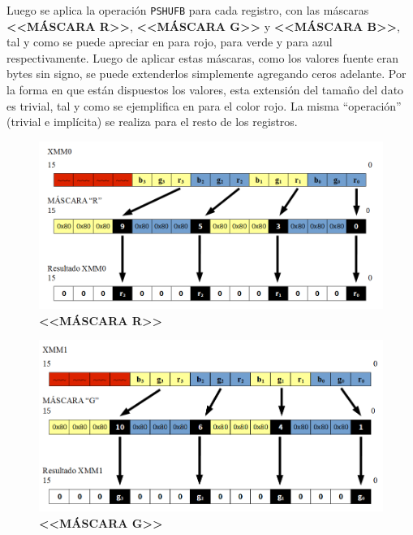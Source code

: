 Luego se aplica la operación \texttt{PSHUFB} para cada registro, con las
máscaras \textbf{<<MÁSCARA R>>}, \textbf{<<MÁSCARA G>>} y \textbf{<<MÁSCARA
B>>}, tal y como se puede apreciar en  para rojo,
 para verde y  para azul respectivamente.
Luego de aplicar estas máscaras, como los valores fuente eran bytes sin signo,
se puede extenderlos simplemente agregando ceros adelante. Por la forma en que
están dispuestos los valores, esta extensión del tamaño del dato es trivial, tal
y como se ejemplifica en  para el color rojo. La misma
``operación'' (trivial e implícita) se realiza para el resto de los registros.

\begin{figure}[H]
  \begin{center}
  \includegraphics[scale=0.55]{imagenes/popart-mask-r.png}
  \caption{\textbf{<<MÁSCARA R>>}}
  \label{fig:popart_mask_r}
  \end{center}
\end{figure}

\begin{figure}[H]
  \begin{center}
  \includegraphics[scale=0.55]{imagenes/popart-mask-g.png}
  \caption{\textbf{<<MÁSCARA G>>}}
  \label{fig:popart_mask_g}
  \end{center}
\end{figure}

